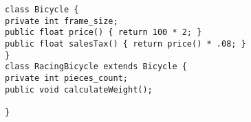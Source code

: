 \begin{verbatim}
class Bicycle {
private int frame_size;
public float price() { return 100 * 2; }
public float salesTax() { return price() * .08; }
}
class RacingBicycle extends Bicycle {
private int pieces_count;
public void calculateWeight();

}
\end{verbatim}
